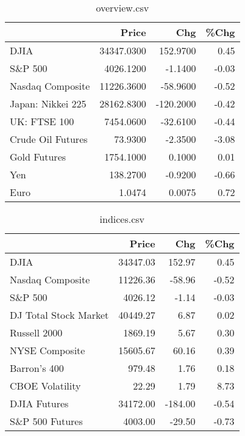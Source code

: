 \documentclass{article}%
\begin{document}
\begin{table}[htbp]%
\caption{overview.csv}%
\centering%
\begin{adjustbox}{width=1\textwidth}%
\begin{tabular}{lrrr}
\toprule
                  &      Price &       Chg &  \%Chg \\
\midrule
             DJIA & 34347.0300 &  152.9700 &  0.45 \\
          S\&P 500 &  4026.1200 &   -1.1400 & -0.03 \\
 Nasdaq Composite & 11226.3600 &  -58.9600 & -0.52 \\
Japan: Nikkei 225 & 28162.8300 & -120.2000 & -0.42 \\
     UK: FTSE 100 &  7454.0600 &  -32.6100 & -0.44 \\
Crude Oil Futures &    73.9300 &   -2.3500 & -3.08 \\
     Gold Futures &  1754.1000 &    0.1000 &  0.01 \\
              Yen &   138.2700 &   -0.9200 & -0.66 \\
             Euro &     1.0474 &    0.0075 &  0.72 \\
\bottomrule
\end{tabular}
%
\end{adjustbox}%
\end{table}

%


\begin{table}[htbp]%
\caption{indices.csv}%
\centering%
\begin{adjustbox}{width=1\textwidth}%
\begin{tabular}{lrrr}
\toprule
                      &    Price &     Chg &  \%Chg \\
\midrule
                 DJIA & 34347.03 &  152.97 &  0.45 \\
     Nasdaq Composite & 11226.36 &  -58.96 & -0.52 \\
              S\&P 500 &  4026.12 &   -1.14 & -0.03 \\
DJ Total Stock Market & 40449.27 &    6.87 &  0.02 \\
         Russell 2000 &  1869.19 &    5.67 &  0.30 \\
       NYSE Composite & 15605.67 &   60.16 &  0.39 \\
         Barron's 400 &   979.48 &    1.76 &  0.18 \\
      CBOE Volatility &    22.29 &    1.79 &  8.73 \\
         DJIA Futures & 34172.00 & -184.00 & -0.54 \\
      S\&P 500 Futures &  4003.00 &  -29.50 & -0.73 \\
\bottomrule
\end{tabular}
%
\end{adjustbox}%
\end{table}
\end{document}
